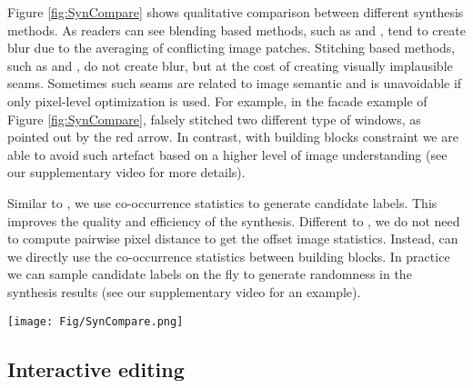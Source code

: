 \documentclass{acmtog}
\begin{document}
Figure \ref{fig:SynCompare} shows qualitative comparison between different synthesis methods. As readers can see blending based methods, such as \cite{Kwatra2005TO} and \cite{Simakov2008SV}, tend to create blur due to the averaging of conflicting image patches. Stitching based methods, such as \cite{Pritch09ICCV} and \cite{He2012PO}, do not create blur, but at the cost of creating visually implausible seams. Sometimes such seams are related to image semantic and is unavoidable if only pixel-level optimization is used. For example, in the facade example of Figure \ref{fig:SynCompare}, \cite{He2012PO} falsely stitched two different type of windows, as pointed out by the red arrow. In contrast, with building blocks constraint we are able to avoid such artefact based on a higher level of image understanding (see our supplementary video for more details). 

Similar to \cite{He2012PO}, we use co-occurrence statistics to generate candidate labels. This improves the quality and efficiency of the synthesis. Different to \cite{He2012PO}, we do not need to compute pairwise pixel distance to get the offset image statistics. Instead, can we directly use the co-occurrence statistics between building blocks. In practice we can sample candidate labels on the fly to generate randomness in the synthesis results (see our supplementary video for an example).

\begin{figure*}
	\centering
		\texttt{[image: Fig/SynCompare.png]}
	\caption{Qualitative comparisons of image retargeting. For each example, we show the input image (top left), the results of \protect\cite{Kwatra2005TO} (top middle), \protect\cite{Simakov2008SV} (top right), \protect\cite{Pritch09ICCV} (bottom left), \protect\cite{He2012PO} (bottom middle) and our result (bottom right).}
	\label{fig:SynCompare} \vspace{-10pt}
\end{figure*}


\subsection{Interactive editing}
\end{document}
